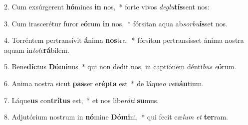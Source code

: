 2. Cum exsúrgerent \textbf{hó}mines \textbf{in} nos,~*  forte vivos \textit{de}\textit{glu}\textbf{tís}sent nos:\

3. Cum irascerétur furor e\textbf{ó}rum \textbf{in} nos,~*  fórsitan aqua ab\textit{sor}\textit{bu}\textbf{ís}set nos.\

4. Torréntem pertransívit \textbf{á}nima \textbf{nos}tra:~*  fórsitan pertransísset ánima nostra aquam in\textit{to}\textit{le}\textbf{rá}bilem.\

5. Bene\textbf{díc}tus \textbf{Dó}\textbf{mi}nus~*  qui non dedit nos, in captiónem dénti\textit{bus} \textit{e}\textbf{ó}rum.\

6. Anima nostra sicut \textbf{pas}ser e\textbf{rép}\textbf{ta} est~*  de láque\textit{o} \textit{ve}\textbf{nán}tium.\

7. Láque\textbf{us} con\textbf{trí}\textbf{tus} est,~*  et nos libe\textit{rá}\textit{ti} \textbf{su}mus.\

8. Adjutórium nostrum in \textbf{nó}mine \textbf{Dó}\textbf{mi}ni,~*  qui fecit cæ\textit{lum} \textit{et} \textbf{ter}ram.\

